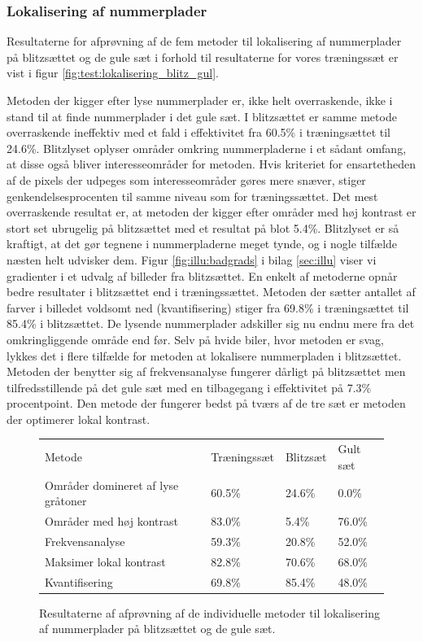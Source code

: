 \subsubsection{Lokalisering af nummerplader}
Resultaterne for afprøvning af de fem metoder til lokalisering af nummerplader på blitzsættet og de gule sæt i forhold til resultaterne for vores træningssæt er vist i figur \vref{fig:test:lokalisering_blitz_gul}.

Metoden der kigger efter lyse nummerplader er, ikke helt overraskende, ikke i stand til at finde nummerplader i det gule sæt. I blitzsættet er samme metode overraskende ineffektiv med et fald i effektivitet fra 60.5\% i træningsættet til 24.6\%. Blitzlyset oplyser områder omkring nummerpladerne i et sådant omfang, at disse også bliver interesseområder for metoden. Hvis kriteriet for ensartetheden af de pixels der udpeges som interesseområder gøres mere snæver, stiger genkendelsesprocenten til samme niveau som for træningssættet. Det mest overraskende resultat er, at metoden der kigger efter områder med høj kontrast er stort set ubrugelig på blitzsættet med et resultat på blot 5.4\%. Blitzlyset er så kraftigt, at det gør tegnene i nummerpladerne meget tynde, og i nogle tilfælde næsten helt udvisker dem. Figur \vref{fig:illu:badgrads} i bilag \ref{sec:illu} viser vi gradienter i et udvalg af billeder fra blitzsættet. En enkelt af metoderne opnår bedre resultater i blitzsættet end i træningssættet. Metoden der sætter antallet af farver i billedet voldsomt ned (kvantifisering) stiger fra 69.8\% i træningsættet til 85.4\% i blitzsættet. De lysende nummerplader adskiller sig nu endnu mere fra det omkringliggende område end før. Selv på hvide biler, hvor metoden er svag, lykkes det i flere tilfælde for metoden at lokalisere nummerpladen i blitzsættet. Metoden der benytter sig af frekvensanalyse fungerer dårligt på blitzsættet men tilfredsstillende på det gule sæt med en tilbagegang i effektivitet på 7.3\% procentpoint. Den metode der fungerer bedst på tværs af de tre sæt er metoden der optimerer lokal kontrast.

\begin{figure}[htp]
\centering
\begin{tabular}{|l|l|l|l|}
\hline
\rowcolor[gray]{0.9} \multicolumn{4}{|>{\columncolor[gray]{0.9}}c|}{\textbf{Individuelle metoder til lokalisering}} \\ \hline
Metode & Træningssæt & Blitzsæt & Gult sæt\\ \hline
Områder domineret af lyse gråtoner & 60.5\% &  24.6\% & 0.0\%\\ \hline
Områder med høj kontrast & 83.0\% & 5.4\% & 76.0\%\\ \hline
Frekvensanalyse & 59.3\% &  20.8\% & 52.0\%\\ \hline
Maksimer lokal kontrast & 82.8\% &  70.6\% & 68.0\%\\ \hline
Kvantifisering & 69.8\% &  85.4\% & 48.0\%\\
\hline
\end{tabular}
\caption{Resultaterne af afprøvning af de individuelle metoder til lokalisering af nummerplader på blitzsættet og de gule sæt.}
\label{fig:test:lokalisering_blitz_gul}
\end{figure}

